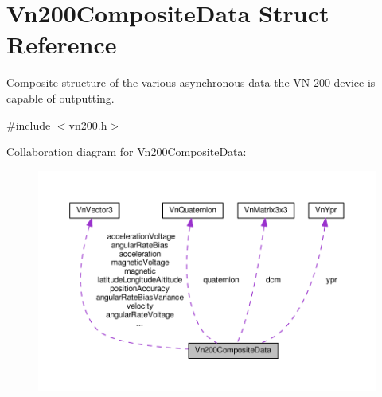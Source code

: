 \hypertarget{structVn200CompositeData}{}\section{Vn200\+Composite\+Data Struct Reference}
\label{structVn200CompositeData}


Composite structure of the various asynchronous data the V\+N-\/200 device is capable of outputting.  




{\ttfamily \#include $<$vn200.\+h$>$}



Collaboration diagram for Vn200\+Composite\+Data\+:\nopagebreak
\begin{figure}[H]
\begin{center}
\leavevmode
\includegraphics[width=350pt]{structVn200CompositeData__coll__graph}
\end{center}
\end{figure}
